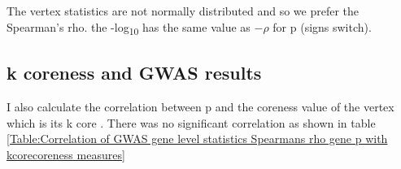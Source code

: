 The vertex statistics are not normally distributed  and so we prefer the Spearman's rho. the -log\textsubscript{10} has the same value as $-\rho$ for p (signs switch).




 \subsection{k coreness and GWAS results}
I also calculate the correlation between p and the coreness value of the vertex which is its k core . There was no significant correlation as shown in table \ref{Table:Correlation of GWAS gene level statistics Spearmans rho gene p  with kcorecoreness measures}

